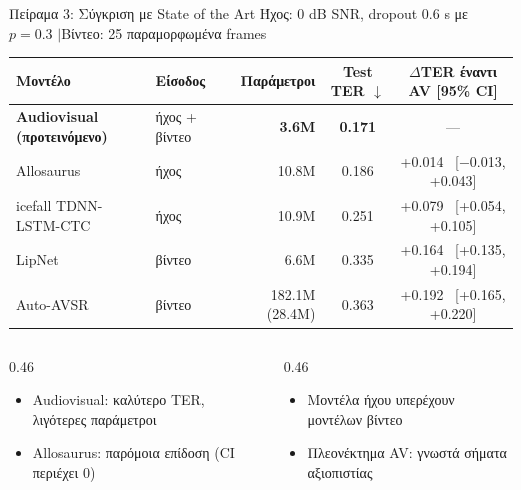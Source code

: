 \documentclass[aspectratio=169,10pt,xcolor=table]{beamer}
\begin{document}
\begin{frame}{Πείραμα 3: Σύγκριση με State of the Art}
  \centering
  {\small Ήχος: 0 dB SNR, dropout 0.6 s με $p=0.3$ \quad$|$\quad Βίντεο: 25 παραμορφωμένα frames}\par
  \vspace{3mm}
  {\footnotesize
  \renewcommand{\arraystretch}{1.15}
  \setlength{\tabcolsep}{4.5pt}
  \begin{tabular}{llrcc}
    \toprule
    \textbf{Μοντέλο} & \textbf{Είσοδος} & \textbf{Παράμετροι} & \textbf{Test TER} $\downarrow$ & \textbf{$\Delta$TER έναντι AV [95\% CI]} \\
    \midrule
    \rowcolor{accent!12}
    \textbf{Audiovisual (προτεινόμενο)} & ήχος + βίντεο & \textbf{3.6M} & \textbf{0.171} & --- \\
    Allosaurus & ήχος & 10.8M & 0.186 & +0.014 \ [$-$0.013, +0.043] \\
    icefall TDNN-LSTM-CTC & ήχος & 10.9M & 0.251 & +0.079 \ [+0.054, +0.105] \\
    LipNet & βίντεο & 6.6M & 0.335 & +0.164 \ [+0.135, +0.194] \\
    Auto-AVSR & βίντεο & 182.1M (28.4M) & 0.363 & +0.192 \ [+0.165, +0.220] \\
    \bottomrule
  \end{tabular}}

  \vspace{4mm}
  \small
  \begin{columns}[T]
    \begin{column}{0.46\textwidth}
      \begin{itemize}
        \item Audiovisual: καλύτερο TER, λιγότερες παράμετροι
        \item Allosaurus: παρόμοια επίδοση (CI περιέχει 0)
      \end{itemize}
    \end{column}
    \begin{column}{0.46\textwidth}
      \begin{itemize}
        \item Μοντέλα ήχου υπερέχουν μοντέλων βίντεο
        \item Πλεονέκτημα AV: γνωστά σήματα αξιοπιστίας
      \end{itemize}
    \end{column}
  \end{columns}
\end{frame}

\end{document}
